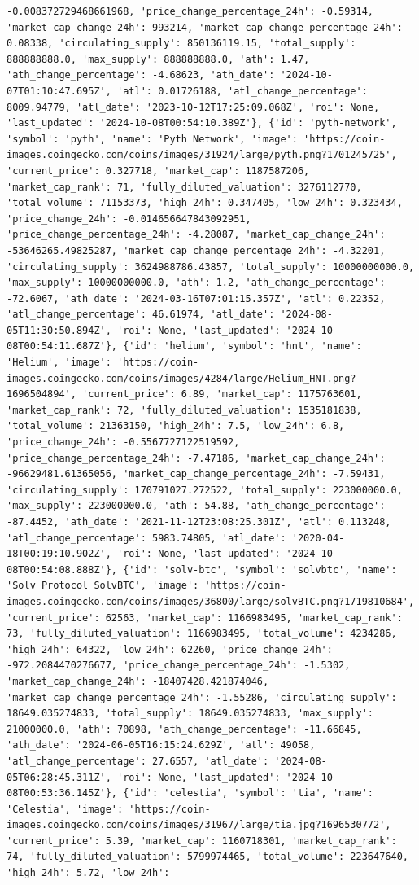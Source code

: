 \documentclass[
  letterpaper,
  DIV=11,
  numbers=noendperiod]{scrreprt}
\begin{document}
\begin{verbatim}
-0.008372729468661968, 'price_change_percentage_24h': -0.59314, 'market_cap_change_24h': 993214, 'market_cap_change_percentage_24h': 0.08338, 'circulating_supply': 850136119.15, 'total_supply': 888888888.0, 'max_supply': 888888888.0, 'ath': 1.47, 'ath_change_percentage': -4.68623, 'ath_date': '2024-10-07T01:10:47.695Z', 'atl': 0.01726188, 'atl_change_percentage': 8009.94779, 'atl_date': '2023-10-12T17:25:09.068Z', 'roi': None, 'last_updated': '2024-10-08T00:54:10.389Z'}, {'id': 'pyth-network', 'symbol': 'pyth', 'name': 'Pyth Network', 'image': 'https://coin-images.coingecko.com/coins/images/31924/large/pyth.png?1701245725', 'current_price': 0.327718, 'market_cap': 1187587206, 'market_cap_rank': 71, 'fully_diluted_valuation': 3276112770, 'total_volume': 71153373, 'high_24h': 0.347405, 'low_24h': 0.323434, 'price_change_24h': -0.014656647843092951, 'price_change_percentage_24h': -4.28087, 'market_cap_change_24h': -53646265.49825287, 'market_cap_change_percentage_24h': -4.32201, 'circulating_supply': 3624988786.43857, 'total_supply': 10000000000.0, 'max_supply': 10000000000.0, 'ath': 1.2, 'ath_change_percentage': -72.6067, 'ath_date': '2024-03-16T07:01:15.357Z', 'atl': 0.22352, 'atl_change_percentage': 46.61974, 'atl_date': '2024-08-05T11:30:50.894Z', 'roi': None, 'last_updated': '2024-10-08T00:54:11.687Z'}, {'id': 'helium', 'symbol': 'hnt', 'name': 'Helium', 'image': 'https://coin-images.coingecko.com/coins/images/4284/large/Helium_HNT.png?1696504894', 'current_price': 6.89, 'market_cap': 1175763601, 'market_cap_rank': 72, 'fully_diluted_valuation': 1535181838, 'total_volume': 21363150, 'high_24h': 7.5, 'low_24h': 6.8, 'price_change_24h': -0.5567727122519592, 'price_change_percentage_24h': -7.47186, 'market_cap_change_24h': -96629481.61365056, 'market_cap_change_percentage_24h': -7.59431, 'circulating_supply': 170791027.272522, 'total_supply': 223000000.0, 'max_supply': 223000000.0, 'ath': 54.88, 'ath_change_percentage': -87.4452, 'ath_date': '2021-11-12T23:08:25.301Z', 'atl': 0.113248, 'atl_change_percentage': 5983.74805, 'atl_date': '2020-04-18T00:19:10.902Z', 'roi': None, 'last_updated': '2024-10-08T00:54:08.888Z'}, {'id': 'solv-btc', 'symbol': 'solvbtc', 'name': 'Solv Protocol SolvBTC', 'image': 'https://coin-images.coingecko.com/coins/images/36800/large/solvBTC.png?1719810684', 'current_price': 62563, 'market_cap': 1166983495, 'market_cap_rank': 73, 'fully_diluted_valuation': 1166983495, 'total_volume': 4234286, 'high_24h': 64322, 'low_24h': 62260, 'price_change_24h': -972.2084470276677, 'price_change_percentage_24h': -1.5302, 'market_cap_change_24h': -18407428.421874046, 'market_cap_change_percentage_24h': -1.55286, 'circulating_supply': 18649.035274833, 'total_supply': 18649.035274833, 'max_supply': 21000000.0, 'ath': 70898, 'ath_change_percentage': -11.66845, 'ath_date': '2024-06-05T16:15:24.629Z', 'atl': 49058, 'atl_change_percentage': 27.6557, 'atl_date': '2024-08-05T06:28:45.311Z', 'roi': None, 'last_updated': '2024-10-08T00:53:36.145Z'}, {'id': 'celestia', 'symbol': 'tia', 'name': 'Celestia', 'image': 'https://coin-images.coingecko.com/coins/images/31967/large/tia.jpg?1696530772', 'current_price': 5.39, 'market_cap': 1160718301, 'market_cap_rank': 74, 'fully_diluted_valuation': 5799974465, 'total_volume': 223647640, 'high_24h': 5.72, 'low_24h': 
\end{verbatim}
\end{document}
